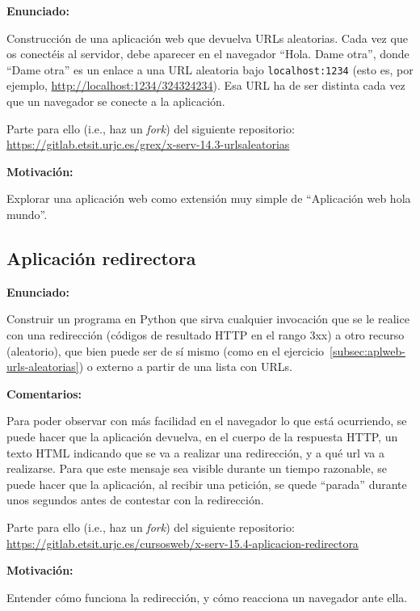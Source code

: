\textbf{Enunciado:}

Construcción de una aplicación web que devuelva URLs aleatorias. Cada vez que os conectéis al servidor, debe aparecer en el navegador ``Hola. Dame otra'', donde ``Dame otra'' es un enlace a una URL aleatoria bajo \verb|localhost:1234| (esto es, por ejemplo, \url{http://localhost:1234/324324234}). Esa URL ha de ser distinta cada vez que un navegador se conecte a la aplicación.

Parte para ello (i.e., haz un \emph{fork}) del siguiente repositorio: \url{https://gitlab.etsit.urjc.es/grex/x-serv-14.3-urlsaleatorias}

\textbf{Motivación:}

Explorar una aplicación web como extensión muy simple de ``Aplicación web hola mundo''.

\subsection{Aplicación redirectora}
\label{subsec:aplweb-redirectora}

\textbf{Enunciado:}

Construir un programa en Python que sirva cualquier invocación que se le realice con una redirección (códigos de resultado HTTP en el rango 3xx) a otro recurso (aleatorio), que bien puede ser de sí mismo (como en el ejercicio~\ref{subsec:aplweb-urls-aleatorias}) o externo a partir de una lista con URLs.

\textbf{Comentarios:}

Para poder observar con más facilidad en el navegador lo que está ocurriendo, se puede hacer que la aplicación devuelva, en el cuerpo de la respuesta HTTP, un texto HTML indicando que se va a realizar una redirección, y a qué url va a realizarse. Para que este mensaje sea visible durante un tiempo razonable, se puede hacer que la aplicación, al recibir una petición, se quede ``parada'' durante unos segundos antes de contestar con la redirección.

Parte para ello (i.e., haz un \emph{fork}) del siguiente repositorio: \url{https://gitlab.etsit.urjc.es/cursosweb/x-serv-15.4-aplicacion-redirectora}


\textbf{Motivación:}

Entender cómo funciona la redirección, y cómo reacciona un navegador ante ella.

